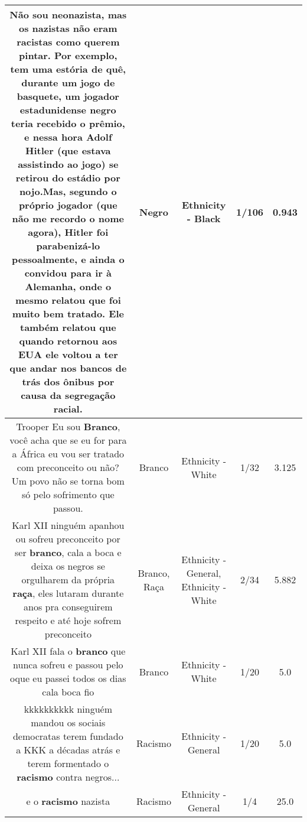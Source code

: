 \documentclass[11pt]{article}
\newlength\mylength
\begin{document}
\begin{center}
\begin{longtable}{|C{.65\mylength}|C{.30\mylength}|C{.12\mylength}|C{.12\mylength}|C{.12\mylength}|}
  \small Não sou neonazista, mas os nazistas não eram racistas como querem pintar. Por exemplo, tem uma estória de quê, durante um jogo de basquete, um jogador estadunidense \textbf{negro} teria recebido o prêmio, e nessa hora Adolf Hitler (que estava assistindo ao jogo) se retirou do estádio por nojo.Mas, segundo o próprio jogador (que não me recordo o nome agora), Hitler foi parabenizá-lo pessoalmente, e ainda o convidou para ir à Alemanha, onde o mesmo relatou que foi muito bem tratado. Ele também relatou que quando retornou aos EUA ele voltou a ter que andar nos bancos de trás dos ônibus por causa da segregação racial.\normalsize   & Negro & Ethnicity - Black & 1/106 & 0.943 \\  \hline
  \small Trooper Eu sou \textbf{Branco}, você acha que se eu for para a África eu vou ser tratado com preconceito ou não? Um povo não se torna bom só pelo sofrimento que passou.\normalsize   & Branco & Ethnicity - White & 1/32 & 3.125 \\  \hline
  \small Karl XII ninguém apanhou ou sofreu preconceito por ser \textbf{branco}, cala a boca e deixa os negros se orgulharem da própria \textbf{raça}, eles lutaram durante anos pra conseguirem respeito e até hoje sofrem preconceito\normalsize   & Branco, Raça & Ethnicity - General, Ethnicity - White & 2/34 & 5.882 \\  \hline
  \small Karl XII fala o \textbf{branco} que nunca sofreu e passou pelo oque eu passei todos os dias cala boca fio\normalsize   & Branco & Ethnicity - White & 1/20 & 5.0 \\  \hline
  \small kkkkkkkkkk ninguém mandou os sociais democratas terem fundado a KKK a décadas atrás e terem formentado o \textbf{racismo} contra negros...\normalsize   & Racismo & Ethnicity - General & 1/20 & 5.0 \\  \hline
  \small e o \textbf{racismo} nazista\normalsize   & Racismo & Ethnicity - General & 1/4 & 25.0 \\  \hline

\end{longtable}
\end{center}
\end{document}
